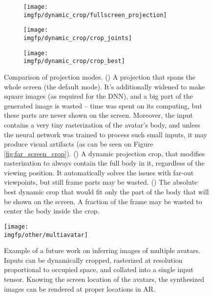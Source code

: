 \begin{figure}
	\centering
	\begin{subfigure}[b]{0.45\textwidth}
		\centering
		\texttt{[image: \\imgfp/dynamic\_crop/fullscreen\_projection]}%
		\caption{}
		\label{fig:explain_crop_fullscreen}
	\end{subfigure}
	\hfill
	\begin{subfigure}[b]{0.27\textwidth}
		\centering
		\texttt{[image: \\imgfp/dynamic\_crop/crop\_joints]}
		\caption{}
		\label{fig:explain_crop_joints}
	\end{subfigure}
	\hfill
	\begin{subfigure}[b]{0.25\textwidth}
		\centering
		\texttt{[image: \\imgfp/dynamic\_crop/crop\_best]}
		\caption{}
		\label{fig:explain_crop_best}
	\end{subfigure}
	\caption{Comparison of projection modes. (\protect{}) A projection that spans the whole screen (the default mode). It's additionally widened to make square images (as required for the DNN), and a big part of the generated image is wasted -- time was spent on its computing, but these parts are never shown on the screen. Moreover, the input contains a very tiny rasterization of the avatar's body, and unless the neural network was trained to process such small inputs, it may produce visual artifacts (as can be seen on Figure \ref{fig:far_screen_crop}). (\protect{}) A dynamic projection crop, that modifies rasterization to always contain the full body in it, regardless of the viewing position. It automatically solves the issues with far-out viewpoints, but still frame parts may be wasted. (\protect{}) The absolute best dynamic crop that would fit only the part of the body that will be shown on the screen. A fraction of the frame may be wasted to center the body inside the crop. }
\end{figure}
\begin{figure}
	\centering%
	\setlength\abovedisplayskip{0pt}%
	\texttt{[image: \\imgfp/other/multiavatar]}%
	\caption{Example of a future work on inferring images of multiple avatars. Inputs can be dynamically cropped, rasterized at resolution proportional to occupied space, and collated into a single input tensor. Knowing the screen location of the avatars, the synthesized images can be rendered at proper locations in AR.}%
	\label{fig:multiavatar}%
	\setlength\belowdisplayskip{0pt}%
\end{figure}

